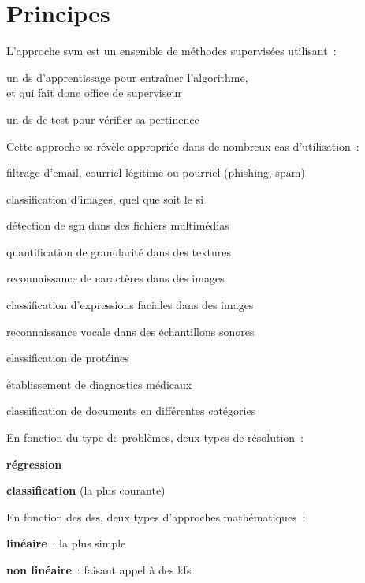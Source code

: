 \section{Principes}

L’approche \gls{svm} est un ensemble de méthodes supervisées utilisant :
\begin{enum}
\item{un \gls{ds} d’apprentissage pour entraîner l’algorithme,\\
et qui fait donc office de superviseur}
\item{un \gls{ds} de test pour vérifier sa pertinence}
\end{enum}

Cette approche se révèle appropriée dans de nombreux cas d’utilisation :
\begin{itmz}
\item{filtrage d’email, courriel légitime ou pourriel (phishing, spam)}
\item{classification d’images, quel que soit le \gls{si}}
\item{détection de \gls{sgn} dans des fichiers multimédias}
\item{quantification de granularité dans des textures}
\item{reconnaissance de caractères dans des images}
\item{classification d’expressions faciales dans des images}
\item{reconnaissance vocale dans des échantillons sonores}
\item{classification de protéines}
\item{établissement de diagnostics médicaux}
\item{classification de documents en différentes catégories}
\end{itmz}

En fonction du type de problèmes, deux types de résolution :
\begin{itmz}
\item{\textbf{régression}}
\item{\textbf{classification} (la plus courante)}
\end{itmz}

En fonction des \glspl{ds}, deux types d’approches mathématiques :
\begin{itmz}
\item{\textbf{linéaire} : la plus simple}
\item{\textbf{non linéaire} : faisant appel à des \glspl{kf}}
\end{itmz}

